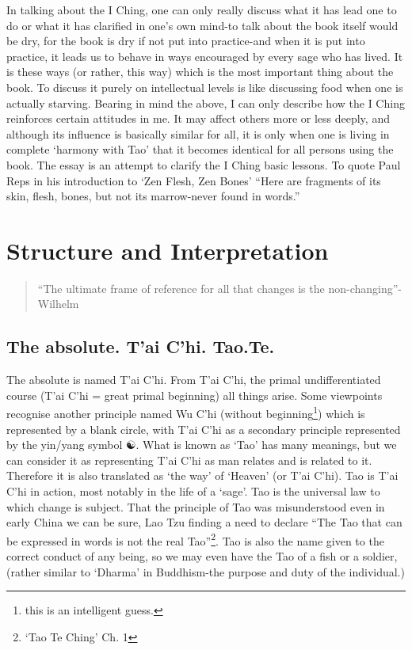 \documentclass[11pt]{book}
\begin{document}
In talking about the I Ching, one can only really discuss what it has lead one to do or what it has clarified in one's own mind-to talk about the book itself would be dry, for the book is dry if not put into practice-and when it is put into practice, it leads us to behave in ways encouraged by every sage who has lived. It is these ways (or rather, this way) which is the most important thing about the book. To discuss it purely on intellectual levels is like discussing food when one is actually starving. Bearing in mind the above, I can only describe how the I Ching reinforces certain attitudes in me. It may affect others more or less deeply, and although its influence is basically similar for all, it is only when one is living in complete `harmony with Tao' that it becomes identical for all persons using the book. The essay is an attempt to clarify the I Ching basic lessons. To quote Paul Reps in his introduction to `Zen Flesh, Zen Bones' ``Here are fragments of its skin, flesh, bones, but not its marrow-never found in words.''

\hypertarget{structure-and-interpretation}{%
\section{Structure and Interpretation}\label{structure-and-interpretation}}

\begin{quote}
``The ultimate frame of reference for all that changes is the non-changing''-Wilhelm
\end{quote}

\hypertarget{the-absolute.-tai-chi.-tao.te.}{%
\subsection{The absolute. T'ai C'hi. Tao.Te.}\label{the-absolute.-tai-chi.-tao.te.}}

The absolute is named T'ai C'hi. From T'ai C'hi, the primal undifferentiated course (T'ai C'hi = great primal beginning) all things arise. Some viewpoints recognise another principle named Wu C'hi (without beginning\footnote{this is an intelligent guess.}) which is represented by a blank circle, with T'ai C'hi as a secondary principle represented by the yin/yang symbol ☯. What is known as `Tao' has many meanings, but we can consider it as representing T'ai C'hi as man relates and is related to it. Therefore it is also translated as `the way' of `Heaven' (or T'ai C'hi). Tao is T'ai C'hi in action, most notably in the life of a `sage'. Tao is the universal law to which change is subject. That the principle of Tao was misunderstood even in early China we can be sure, Lao Tzu finding a need to declare ``The Tao that can be expressed in words is not the real Tao''\footnote{`Tao Te Ching' Ch. 1}. Tao is also the name given to the correct conduct of any being, so we may even have the Tao of a fish or a soldier, (rather similar to `Dharma' in Buddhism-the purpose and duty of the individual.)
\end{document}
